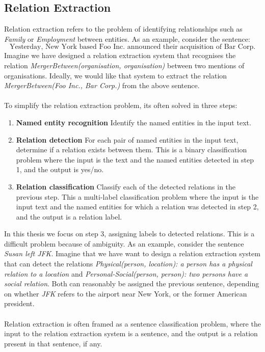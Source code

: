 \subsection{Relation Extraction}
\label{relation_extract}
Relation extraction refers to the problem of identifying relationships such as \textit{Family} or \textit{Employment} between entities. As an example, consider the sentence: 
$$
\text{Yesterday, New York based Foo Inc. announced their acquisition of Bar Corp.}
$$ 
Imagine we have designed a relation extraction system that recognises the relation \textit{MergerBetween(organisation, organisation)} between two mentions of organisations. Ideally, we would like that system to extract the relation \textit{MergerBetween(Foo Inc., Bar Corp.)} from the above sentence.
\\\\
To simplify the relation extraction problem, its often solved in three steps:
\begin{enumerate}
	\item \textbf{Named entity recognition} \enspace Identify the named entities in the input text.
	\item \textbf{Relation detection} \enspace For each pair of named entities in the input text, determine if a relation exists between them. This is a binary classification problem where the input is the text and the named entities detected in step 1, and the output is yes/no.
	\item \textbf{Relation classification} \enspace Classify each of the detected relations in the previous step. This a multi-label classification problem where the input is the input text and the named entities for which a relation was detected in step 2, and the output is a relation label.
\end{enumerate}
In this thesis we focus on step 3, assigning labels to detected relations. This is a difficult problem because of ambiguity. As an example, consider the sentence \textit{Susan left JFK}. Imagine that we have want to design a relation extraction system that can detect the relations \textit{Physical(person, location): a person has a physical relation to a location} and \textit{Personal-Social(person, person): two persons have a social relation}. Both can reasonably be assigned the previous sentence, depending on whether \textit{JFK} refers to the airport near New York, or the former American president.
\\\\
Relation extraction is often framed as a sentence classification problem, where the input to the relation extraction system is a sentence, and the output is a relation present in that sentence, if any.

